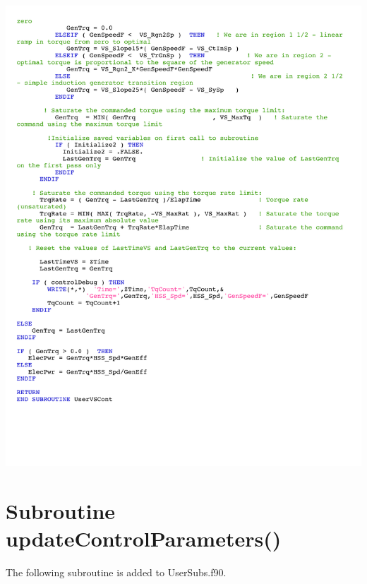 \noindent
\includegraphics[width=\linewidth]{Figures/AppendixDFigures/figD-2D.pdf}


\section{Subroutine updateControlParameters()} \label{sectionD-3}
The following subroutine is added to UserSubs.f90.

